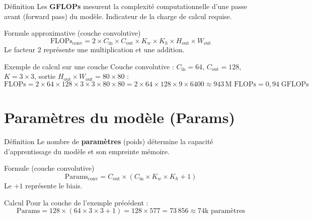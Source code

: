\documentclass[12pt, a4paper]{report}
\begin{document}
\begin{definitionbox}{Définition}
  Les \textbf{GFLOPs} mesurent la complexité computationnelle d'une passe avant
  (forward pass) du modèle. Indicateur de la charge de calcul requise.
\end{definitionbox}

\begin{formulebox}{Formule approximative (couche convolutive)}
  \[
    \text{FLOPs}_{\text{conv}} =
      2 \times C_{\text{in}} \times C_{\text{out}} \times K_w \times K_h \times H_{\text{out}} \times W_{\text{out}}
  \]
  Le facteur 2 représente une multiplication et une addition.
\end{formulebox}

\begin{examplebox}{Exemple de calcul sur une couche}
  Couche convolutive : $C_{\text{in}}=64$, $C_{\text{out}}=128$, $K=3\times3$,
  sortie $H_{\text{out}} \times W_{\text{out}} = 80\times80$ :
  \[
    \text{FLOPs} = 2 \times 64 \times 128 \times 3 \times 3 \times 80 \times 80
                = 2 \times 64 \times 128 \times 9 \times 6400
                \approx 943\,\text{M FLOPs} = 0{,}94\;\text{GFLOPs}
  \]
\end{examplebox}

\section{Paramètres du modèle (Params)}

\begin{definitionbox}{Définition}
  Le nombre de \textbf{paramètres} (poids) détermine la capacité d'apprentissage
  du modèle et son empreinte mémoire.
\end{definitionbox}

\begin{formulebox}{Formule (couche convolutive)}
  \[
    \text{Params}_{\text{conv}} = C_{\text{out}} \times (C_{\text{in}} \times K_w \times K_h + 1)
  \]
  Le $+1$ représente le biais.
\end{formulebox}

\begin{examplebox}{Calcul}
  Pour la couche de l'exemple précédent :
  \[
    \text{Params} = 128 \times (64 \times 3 \times 3 + 1) = 128 \times 577 = 73\,856
    \approx 74\text{k paramètres}
  \]
\end{examplebox}

\end{document}

